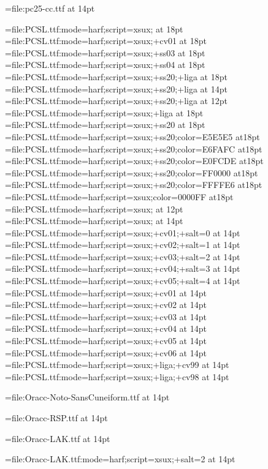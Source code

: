 \font\pccc={file:pc25-cc.ttf} at 14pt

\font\pcxxv={file:PCSL.ttf:mode=harf;script=xsux;} at 18pt
\font\pccvi={file:PCSL.ttf:mode=harf;script=xsux;+cv01} at 18pt
\font\pcssiii={file:PCSL.ttf:mode=harf;script=xsux;+ss03} at 18pt
\font\pcssiv={file:PCSL.ttf:mode=harf;script=xsux;+ss04} at 18pt
\font\pcssXX={file:PCSL.ttf:mode=harf;script=xsux;+ss20;+liga} at 18pt
\font\pcssxx={file:PCSL.ttf:mode=harf;script=xsux;+ss20;+liga} at 14pt
\font\pcssxxx={file:PCSL.ttf:mode=harf;script=xsux;+ss20;+liga} at 12pt
\font\pcxviii={file:PCSL.ttf:mode=harf;script=xsux;+liga} at 18pt
\font\pcssxx={file:PCSL.ttf:mode=harf;script=xsux;+ss20} at 18pt
\font\pceee={file:PCSL.ttf:mode=harf;script=xsux;+ss20;color=E5E5E5} at18pt
\font\pceff={file:PCSL.ttf:mode=harf;script=xsux;+ss20;color=E6FAFC} at18pt
\font\pcefd={file:PCSL.ttf:mode=harf;script=xsux;+ss20;color=E0FCDE} at18pt
\font\pcfee={file:PCSL.ttf:mode=harf;script=xsux;+ss20;color=FF0000} at18pt
\font\pcffe={file:PCSL.ttf:mode=harf;script=xsux;+ss20;color=FFFFE6} at18pt
\font\pcblu={file:PCSL.ttf:mode=harf;script=xsux;color=0000FF} at18pt
\font\pcringop={file:PCSL.ttf:mode=harf;script=xsux;} at 12pt
\font\pcseq={file:PCSL.ttf:mode=harf;script=xsux;} at 14pt
\font\pcseqi={file:PCSL.ttf:mode=harf;script=xsux;+cv01;+salt=0} at 14pt
\font\pcseqii={file:PCSL.ttf:mode=harf;script=xsux;+cv02;+salt=1} at 14pt
\font\pcseqiii={file:PCSL.ttf:mode=harf;script=xsux;+cv03;+salt=2} at 14pt
\font\pcseqiv={file:PCSL.ttf:mode=harf;script=xsux;+cv04;+salt=3} at 14pt
\font\pcseqv={file:PCSL.ttf:mode=harf;script=xsux;+cv05;+salt=4} at 14pt
\font\pccvi={file:PCSL.ttf:mode=harf;script=xsux;+cv01} at 14pt
\font\pccvii={file:PCSL.ttf:mode=harf;script=xsux;+cv02} at 14pt
\font\pccviii={file:PCSL.ttf:mode=harf;script=xsux;+cv03} at 14pt
\font\pccviv={file:PCSL.ttf:mode=harf;script=xsux;+cv04} at 14pt
\font\pccvv={file:PCSL.ttf:mode=harf;script=xsux;+cv05} at 14pt
\font\pccvvi={file:PCSL.ttf:mode=harf;script=xsux;+cv06} at 14pt
\font\pccvxcix={file:PCSL.ttf:mode=harf;script=xsux;+liga;+cv99} at 14pt
\font\pccvxcviii={file:PCSL.ttf:mode=harf;script=xsux;+liga;+cv98} at 14pt

\font\oraccnoto={file:Oracc-Noto-SansCuneiform.ttf} at 14pt

\font\oraccrsp={file:Oracc-RSP.ttf} at 14pt

\font\oracclak={file:Oracc-LAK.ttf} at 14pt

\font\oracclaksaltiii={file:Oracc-LAK.ttf:mode=harf;script=xsux;+salt=2} at 14pt

\endinput
